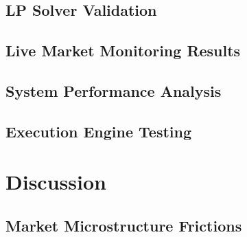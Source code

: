 \documentclass[openany]{book}
\numberwithin{figure}{chapter}
\numberwithin{equation}{chapter}
\begin{document}
\section{LP Solver Validation}

\section{Live Market Monitoring Results}

\section{System Performance Analysis}

\section{Execution Engine Testing}

\chapter{Discussion}

\section{Market Microstructure Frictions}
\end{document}
